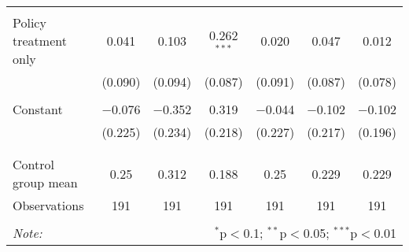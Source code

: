 \begin{tabular}{@{\extracolsep{5pt}}lcccccc}
  & & & & & & \\ 
 Policy treatment only & 0.041 & 0.103 & 0.262$^{***}$ & 0.020 & 0.047 & 0.012 \\ 
  & (0.090) & (0.094) & (0.087) & (0.091) & (0.087) & (0.078) \\ 
  & & & & & & \\ 
 Constant & $-$0.076 & $-$0.352 & 0.319 & $-$0.044 & $-$0.102 & $-$0.102 \\ 
  & (0.225) & (0.234) & (0.218) & (0.227) & (0.217) & (0.196) \\ 
  & & & & & & \\ 
\hline \\[-1.8ex] 
Control group mean & 0.25 & 0.312 & 0.188 & 0.25 & 0.229 & 0.229 \\ 
Observations & 191 & 191 & 191 & 191 & 191 & 191 \\ 
\hline 
\hline \\[-1.8ex] 
\textit{Note:}  & \multicolumn{6}{r}{$^{*}$p$<$0.1; $^{**}$p$<$0.05; $^{***}$p$<$0.01} \\ 
\end{tabular} 
